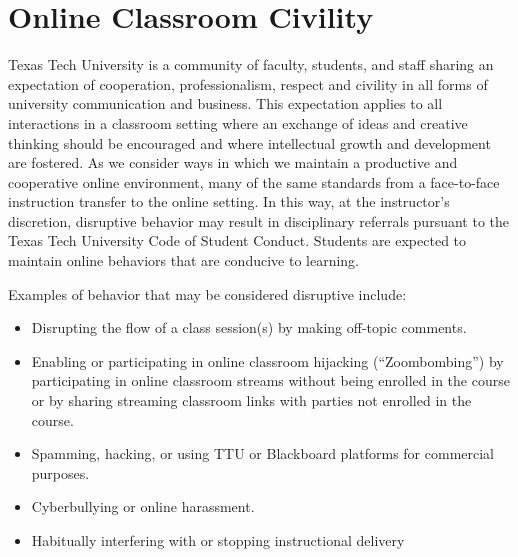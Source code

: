 \documentclass[12pt, notitlepage]{article}   	%
\begin{document}
{\section{Online Classroom Civility}
Texas Tech University is a community of faculty, students, and staff sharing an 
expectation of cooperation, professionalism, respect and civility in all forms of 
university communication and business. This expectation applies to all interactions in a 
classroom setting where an exchange of ideas and creative thinking should be encouraged 
and where intellectual growth and development are fostered. As we consider ways in which 
we maintain a productive and cooperative online environment, many of the same standards 
from a face-to-face instruction transfer to the online setting. In this way, at the 
instructor’s discretion, disruptive behavior may result in disciplinary referrals pursuant 
to the Texas Tech University Code of Student Conduct. Students are expected to maintain 
online behaviors that are conducive to learning.

Examples of behavior that may be considered disruptive include:
\begin{itemize}
	\item{Disrupting the flow of a class session(s) by making off-topic comments.}
	\item{Enabling or participating in online classroom hijacking (“Zoombombing”) by 
	participating in online classroom streams without being enrolled in the course or 
	by sharing streaming classroom links with parties not enrolled in the course.}
	\item{Spamming, hacking, or using TTU or Blackboard platforms for commercial purposes.}
	\item{Cyberbullying or online harassment.}
	\item{Habitually interfering with or stopping instructional delivery}
\end{itemize}

\newpage

}
\end{document}
